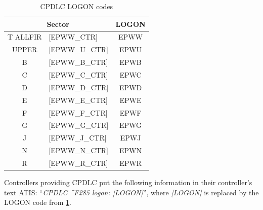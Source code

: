 \begin{table}[htbp]
	\centering
	\begin{tabular}{|c l|c|}
		\hline
		\multicolumn{2}{|c|}{\cellcolor{vred}\color{white}\textbf{Sector}} & \cellcolor{vred}\color{white}\textbf{LOGON}        \\\hline
		\color{Orange}T ALLFIR                                             & \tiny [EPWW\_CTR]                           & EPWW \\\hline
		\color{OliveGreen}UPPER                                            & \tiny [EPWW\_U\_CTR]                        & EPWU \\\hline
		\color{ProcessBlue}B                                               & \tiny [EPWW\_B\_CTR]                        & EPWB \\\hline
		\color{Orange}C                                                    & \tiny [EPWW\_C\_CTR]                        & EPWC \\\hline
		\color{Orange}D                                                    & \tiny [EPWW\_D\_CTR]                        & EPWD \\\hline
		\color{MidnightBlue}E                                              & \tiny [EPWW\_E\_CTR]                        & EPWE \\\hline
		\color{ProcessBlue}F                                               & \tiny [EPWW\_F\_CTR]                        & EPWF \\\hline
		\color{ProcessBlue}G                                               & \tiny [EPWW\_G\_CTR]                        & EPWG \\\hline
		\color{vred}J                                                      & \tiny [EPWW\_J\_CTR]                        & EPWJ \\\hline
		\color{MidnightBlue}N                                              & \tiny [EPWW\_N\_CTR]                        & EPWN \\\hline
		\color{vred}R                                                      & \tiny [EPWW\_R\_CTR]                        & EPWR \\\hline
	\end{tabular}
	\caption{CPDLC LOGON codes}
	\label{tab:acc:cpdlc}
\end{table}

Controllers providing CPDLC put the following information in their controller's
text ATIS: ``\textit{CPDLC \^{}F285 logon: [LOGON]}'', where \textit{[LOGON]} is
replaced by the LOGON code from \cref{tab:acc:cpdlc}.

